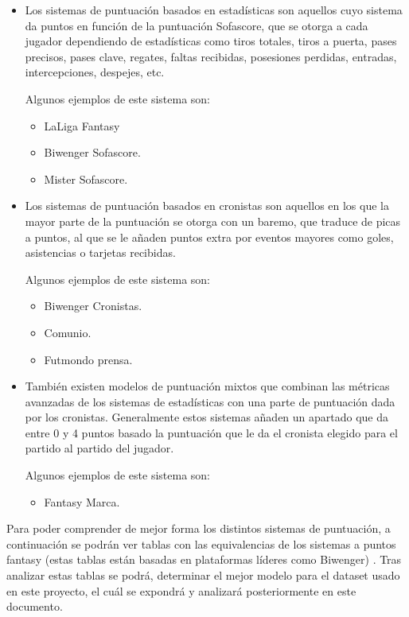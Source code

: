 \begin{itemize}
    \item Los sistemas de puntuación basados en estadísticas son aquellos cuyo sistema da puntos en función de la puntuación Sofascore, que se otorga a cada jugador dependiendo de estadísticas como tiros totales, tiros a puerta, pases precisos, pases clave, regates, faltas recibidas, posesiones perdidas, entradas, intercepciones, despejes, etc.

    Algunos ejemplos de este sistema son:
    \begin{itemize}
        \item LaLiga Fantasy
        \item Biwenger Sofascore.
        \item Mister Sofascore.
    \end{itemize}

    \item Los sistemas de puntuación basados en cronistas son aquellos en los que la mayor parte de la puntuación se otorga con un baremo, que traduce de picas a puntos, al que se le añaden puntos extra por eventos mayores como goles, asistencias o tarjetas recibidas.

    Algunos ejemplos de este sistema son:
    \begin{itemize}
        \item Biwenger Cronistas.
        \item Comunio.
        \item Futmondo prensa.
    \end{itemize}

    \item También existen modelos de puntuación mixtos que combinan las métricas avanzadas de los sistemas de estadísticas con una parte de puntuación dada por los cronistas. Generalmente estos sistemas añaden un apartado que da entre 0 y 4 puntos basado la puntuación que le da el cronista elegido para el partido al partido del jugador.

    Algunos ejemplos de este sistema son:
    \begin{itemize}
        \item Fantasy Marca.
    \end{itemize}
\end{itemize}

Para poder comprender de mejor forma los distintos sistemas de puntuación, a continuación se podrán ver tablas con las equivalencias de los sistemas a puntos fantasy (estas tablas están basadas en plataformas líderes como Biwenger) \cite{reglas_biwenger}. Tras analizar estas tablas se podrá, determinar el mejor modelo para el dataset usado en este proyecto, el cuál se expondrá y analizará posteriormente en este documento.

